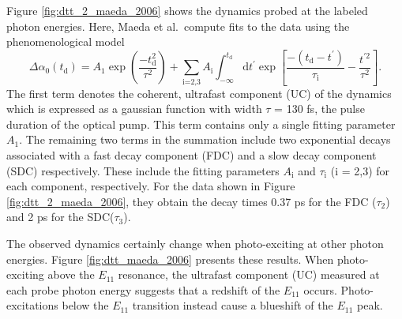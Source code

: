 Figure \ref{fig:dtt_2_maeda_2006} shows the dynamics probed at the labeled photon energies. Here, Maeda et al.\ compute fits to the data using the phenomenological model
\begin{equation}
	\Delta \alpha_0(t_\text{d}) = A_1 \exp\left( \frac{-t_\text{d}^2}{\tau^2}\right) + \sum_\text{i=2,3} A_\text{i} \int^{t_\text{d}}_{-\infty} \mathrm{d} t^\prime \exp\left[ \frac{-(t_\text{d} - t^\prime)}{\tau_\text{i}} - \frac{t^{\prime 2}}{\tau^2}\right].
	\label{eq:fits_maeda_2006}
\end{equation}
The first term denotes the coherent, ultrafast component (UC) of the dynamics which is expressed as a gaussian function with width $\tau$ = 130 fs, the pulse duration of the optical pump. This term contains only a single fitting parameter $A_1$. The remaining two terms in the summation include two exponential decays associated with a fast decay component (FDC) and a slow decay component (SDC) respectively. These include the fitting parameters $A_\text{i}$ and $\tau_\text{i}$ (i = 2,3) for each component, respectively. For the data shown in Figure \ref{fig:dtt_2_maeda_2006}, they obtain the decay times 0.37 ps for the FDC ($\tau_2$) and 2 ps for the SDC($\tau_3$).

The observed dynamics certainly change when photo-exciting at other photon energies. Figure \ref{fig:dtt_maeda_2006} presents these results. When photo-exciting above the $E_{11}$ resonance, the ultrafast component (UC) measured at each probe photon energy suggests that a redshift of the $E_{11}$ occurs. Photo-excitations below the $E_{11}$ transition instead cause a blueshift of the $E_{11}$ peak.


